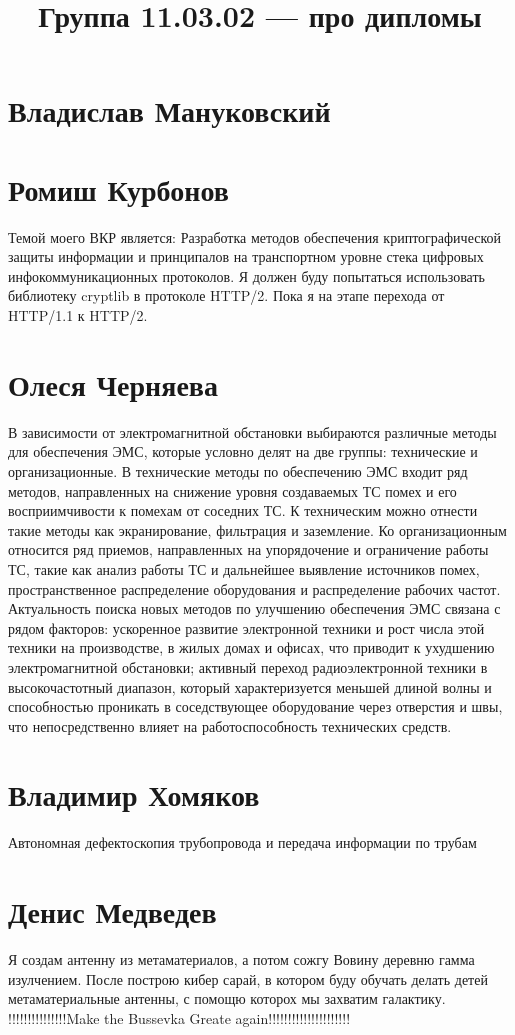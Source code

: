 \documentclass{article}
\title{Группа 11.03.02 --- про дипломы}
\begin{document}
\section*{Владислав Мануковский}

\section*{Ромиш Курбонов}

Темой моего ВКР является: Разработка методов обеспечения криптографической защиты информации и принципалов на транспортном уровне стека цифровых инфокоммуникационных протоколов.
Я должен буду попытаться использовать библиотеку cryptlib в протоколе HTTP/2. Пока я на этапе перехода от HTTP/1.1 к HTTP/2.

\section*{Олеся Черняева}
В зависимости от электромагнитной обстановки выбираются различные методы для обеспечения ЭМС, которые условно делят на две группы: технические и организационные. В технические методы по обеспечению ЭМС входит ряд методов, направленных на снижение уровня создаваемых ТС помех и его восприимчивости к помехам от соседних ТС. К техническим можно отнести такие методы как экранирование, фильтрация и заземление. Ко организационным относится ряд приемов, направленных на упорядочение и ограничение работы ТС, такие как анализ работы ТС и дальнейшее выявление источников помех, пространственное распределение оборудования и распределение рабочих частот. 
Актуальность поиска новых методов по улучшению обеспечения ЭМС связана с рядом факторов: ускоренное развитие электронной техники и рост числа этой техники на производстве, в жилых домах и офисах, что приводит к ухудшению электромагнитной обстановки; активный переход радиоэлектронной техники в высокочастотный диапазон, который характеризуется меньшей длиной волны и способностью проникать в соседствующее оборудование через отверстия и швы, что непосредственно влияет на работоспособность технических средств. 

\section*{Владимир Хомяков} 
Автономная дефектоскопия трубопровода и передача информации по трубам

\section*{Денис Медведев}
Я создам антенну из метаматериалов, а потом сожгу Вовину деревню гамма изулчением. После построю кибер сарай, в котором буду обучать делать детей метаматериальные антенны, с помощю которох мы захватим галактику. !!!!!!!!!!!!!!!Make the Bussevka Greate again!!!!!!!!!!!!!!!!!!!!!
\end{document}
